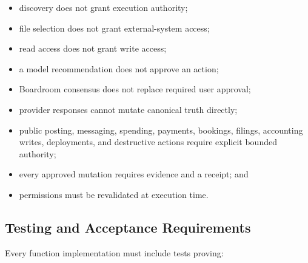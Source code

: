 \begin{itemize}
  \item discovery does not grant execution authority;
  \item file selection does not grant external-system access;
  \item read access does not grant write access;
  \item a model recommendation does not approve an action;
  \item Boardroom consensus does not replace required user approval;
  \item provider responses cannot mutate canonical truth directly;
  \item public posting, messaging, spending, payments, bookings, filings,
  accounting writes, deployments, and destructive actions require explicit
  bounded authority;
  \item every approved mutation requires evidence and a receipt; and
  \item permissions must be revalidated at execution time.
\end{itemize}

\subsection{Testing and Acceptance Requirements}

Every function implementation must include tests proving:

